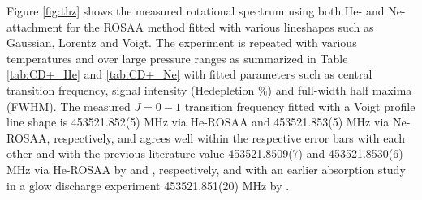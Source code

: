 
Figure \ref{fig:thz} shows the measured \CD rotational spectrum using both He-
and Ne-attachment for the ROSAA method fitted with various lineshapes such as Gaussian,
Lorentz and Voigt. The experiment is repeated with various temperatures and
over large pressure ranges as summarized in Table \ref{tab:CD+_He} and
\ref{tab:CD+_Ne} with fitted parameters such as central transition frequency,
signal intensity (He\CD depletion \%) and full-width half maxima (FWHM). The
measured $J=0-1$ transition frequency fitted with a Voigt profile line shape is
453521.852(5) MHz via He-ROSAA and 453521.853(5) MHz via Ne-ROSAA,
respectively, and agrees well within the respective error bars with each other
and with the previous literature value 453521.8509(7) and 453521.8530(6) MHz
via He-ROSAA by \citet{Brunken2017} and \citet{domenech_first_2018},
respectively, and with an earlier absorption study in a glow discharge experiment 453521.851(20) MHz by
\citet{amano_j_2010}.

